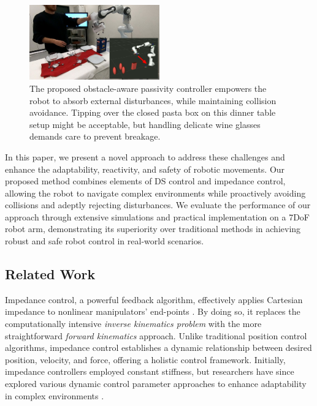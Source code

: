 \begin{figure}
\centerline{\includegraphics[width=0.5\textwidth]{figures/robot_arm_table_avoidance}}
\caption{
The proposed obstacle-aware passivity controller empowers the robot to absorb external disturbances, while maintaining collision avoidance. 
Tipping over the closed pasta box on this dinner table setup might be acceptable, but handling delicate wine glasses demands care to prevent breakage.
}
\label{fig:table_avoidance_with_obstacle}
\end{figure}

In this paper, we present a novel approach to address these challenges and enhance the adaptability, reactivity, and safety of robotic movements. Our proposed method combines elements of DS control and impedance control, allowing the robot to navigate complex environments while proactively avoiding collisions and adeptly rejecting disturbances. We evaluate the performance of our approach through extensive simulations and practical implementation on a 7DoF robot arm, demonstrating its superiority over traditional methods in achieving robust and safe robot control in real-world scenarios.


\subsection{Related Work}
Impedance control, a powerful feedback algorithm, effectively applies Cartesian impedance to nonlinear manipulators' end-points \cite{takegaki1981new, hogan1985impedance}. By doing so, it replaces the computationally intensive \textit{inverse kinematics problem} with the more straightforward \textit{forward kinematics} approach. Unlike traditional position control algorithms, impedance control establishes a dynamic relationship between desired position, velocity, and force, offering a holistic control framework.
Initially, impedance controllers employed constant stiffness, but researchers have since explored various dynamic control parameter approaches to enhance adaptability in complex environments \cite{vanderborght2013variable, abu2020variable}.


